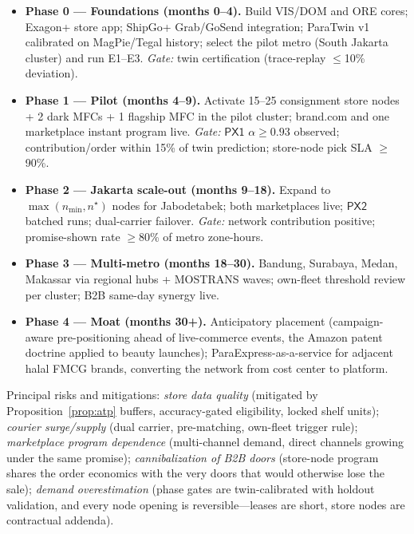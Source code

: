 \documentclass[journal]{IEEEtran}
\begin{document}
\begin{itemize}[leftmargin=*]
  \item \textbf{Phase 0 --- Foundations (months 0--4).} Build VIS/DOM and ORE cores; Exagon+ store app; ShipGo+ Grab/GoSend integration; ParaTwin v1 calibrated on MagPie/Tegal history; select the pilot metro (South Jakarta cluster) and run E1--E3. \emph{Gate:} twin certification (trace-replay $\le$10\% deviation).
  \item \textbf{Phase 1 --- Pilot (months 4--9).} Activate 15--25 consignment store nodes + 2 dark MFCs + 1 flagship MFC in the pilot cluster; brand.com and one marketplace instant program live. \emph{Gate:} $\mathsf{PX1}$ $\alpha \ge 0.93$ observed; contribution/order within 15\% of twin prediction; store-node pick SLA $\ge$90\%.
  \item \textbf{Phase 2 --- Jakarta scale-out (months 9--18).} Expand to $\max(n_{\min}, n^\star)$ nodes for Jabodetabek; both marketplaces live; $\mathsf{PX2}$ batched runs; dual-carrier failover. \emph{Gate:} network contribution positive; promise-shown rate $\ge$80\% of metro zone-hours.
  \item \textbf{Phase 3 --- Multi-metro (months 18--30).} Bandung, Surabaya, Medan, Makassar via regional hubs + MOSTRANS waves; own-fleet threshold review per cluster; B2B same-day synergy live.
  \item \textbf{Phase 4 --- Moat (months 30+).} Anticipatory placement (campaign-aware pre-positioning ahead of live-commerce events, the Amazon patent doctrine \cite{anticipatory} applied to beauty launches); ParaExpress-as-a-service for adjacent halal FMCG brands, converting the network from cost center to platform.
\end{itemize}

Principal risks and mitigations: \emph{store data quality} (mitigated by Proposition~\ref{prop:atp} buffers, accuracy-gated eligibility, locked shelf units); \emph{courier surge/supply} (dual carrier, pre-matching, own-fleet trigger rule); \emph{marketplace program dependence} (multi-channel demand, direct channels growing under the same promise); \emph{cannibalization of B2B doors} (store-node program shares the order economics with the very doors that would otherwise lose the sale); \emph{demand overestimation} (phase gates are twin-calibrated with holdout validation, and every node opening is reversible---leases are short, store nodes are contractual addenda).
\end{document}
